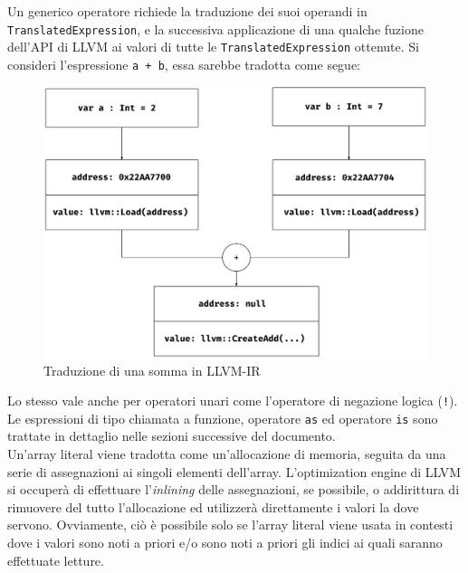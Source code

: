\newpage

Un generico operatore richiede la traduzione dei suoi operandi in \texttt{TranslatedExpression}, e la
successiva applicazione di una qualche fuzione dell'API di LLVM ai valori di tutte le \texttt{TranslatedExpression} ottenute. Si consideri
l'espressione \texttt{a + b}, essa sarebbe tradotta come segue: \\

\vspace{0.3cm}
\begin{figure}[H]
    \includegraphics[width=\textwidth]{../../Assets/LLVMExpr5}
    \caption{Traduzione di una somma in LLVM-IR}
\end{figure}
\vspace{0.3cm}

Lo stesso vale anche per operatori unari come l'operatore di negazione logica (\texttt{!}). Le espressioni 
di tipo chiamata a funzione, operatore \texttt{as} ed operatore \texttt{is} sono trattate in dettaglio 
nelle sezioni successive del documento. \\

Un'array literal viene tradotta come un'allocazione di memoria, seguita da una serie di assegnazioni
ai singoli elementi dell'array. L'optimization engine di LLVM si occuperà di effettuare l'\textit{inlining}
delle assegnazioni, se possibile, o addirittura di rimuovere del tutto l'allocazione ed utilizzerà direttamente 
i valori la dove servono. Ovviamente, ciò è possibile solo se l'array literal viene usata in contesti 
dove i valori sono noti a priori e/o sono noti a priori gli indici ai quali saranno effettuate letture. \\

\newpage